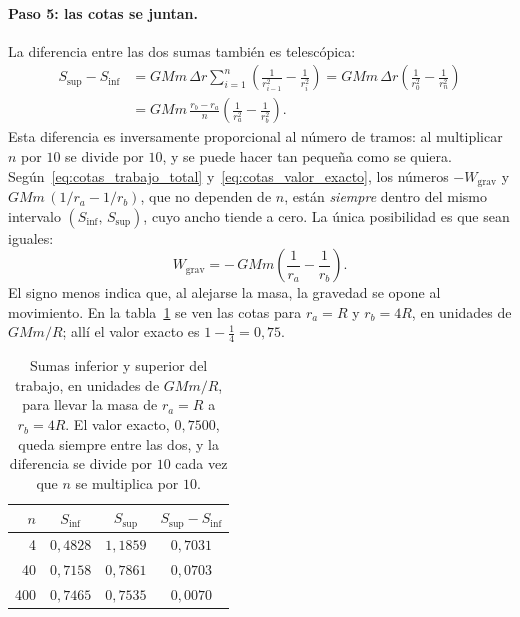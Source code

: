 \paragraph{Paso 5: las cotas se juntan.}
La diferencia entre las dos sumas también es telescópica:
\begin{align}
  S_{\text{sup}} - S_{\text{inf}}
  &= GMm\,\Delta r \sum_{i=1}^{n}
     \left(\frac{1}{r_{i-1}^{2}} - \frac{1}{r_{i}^{2}}\right)
   = GMm\,\Delta r \left(\frac{1}{r_{0}^{2}} - \frac{1}{r_{n}^{2}}\right)
   \nonumber\\
  &= GMm\,\frac{r_{b} - r_{a}}{n}
     \left(\frac{1}{r_{a}^{2}} - \frac{1}{r_{b}^{2}}\right) .
  \label{eq:diferencia_cotas}
\end{align}
Esta diferencia es inversamente proporcional al número de tramos: al
multiplicar $n$ por $10$ se divide por $10$, y se puede hacer tan pequeña
como se quiera. Según~\eqref{eq:cotas_trabajo_total}
y~\eqref{eq:cotas_valor_exacto}, los números $-W_{\text{grav}}$ y
$GMm\,(1/r_{a} - 1/r_{b})$, que no dependen de $n$, están \emph{siempre}
dentro del mismo intervalo $(S_{\text{inf}},\, S_{\text{sup}})$, cuyo ancho
tiende a cero. La única posibilidad es que sean iguales:
\begin{equation}
  W_{\text{grav}} = -\,GMm\left(\frac{1}{r_{a}} - \frac{1}{r_{b}}\right) .
  \label{eq:trabajo_grav_r1_r2}
\end{equation}
El signo menos indica que, al alejarse la masa, la gravedad se opone al
movimiento. En la tabla~\ref{tab:cotas_trabajo} se ven las cotas para
$r_{a} = R$ y $r_{b} = 4R$, en unidades de $GMm/R$; allí el valor exacto es
$1 - \tfrac{1}{4} = 0{,}75$.

\begin{table}[htbp]
  \centering
  \caption{Sumas inferior y superior del trabajo, en unidades de $GMm/R$, para
    llevar la masa de $r_{a} = R$ a $r_{b} = 4R$. El valor exacto,
    $0{,}7500$, queda siempre entre las dos, y la diferencia se divide por
    $10$ cada vez que $n$ se multiplica por $10$.}
  \label{tab:cotas_trabajo}
  \begin{tabular}{@{}rccc@{}}
    \toprule
    $n$ & $S_{\text{inf}}$ & $S_{\text{sup}}$ & $S_{\text{sup}} - S_{\text{inf}}$ \\
    \midrule
    4   & $0{,}4828$ & $1{,}1859$ & $0{,}7031$ \\
    40  & $0{,}7158$ & $0{,}7861$ & $0{,}0703$ \\
    400 & $0{,}7465$ & $0{,}7535$ & $0{,}0070$ \\
    \bottomrule
  \end{tabular}
\end{table}

